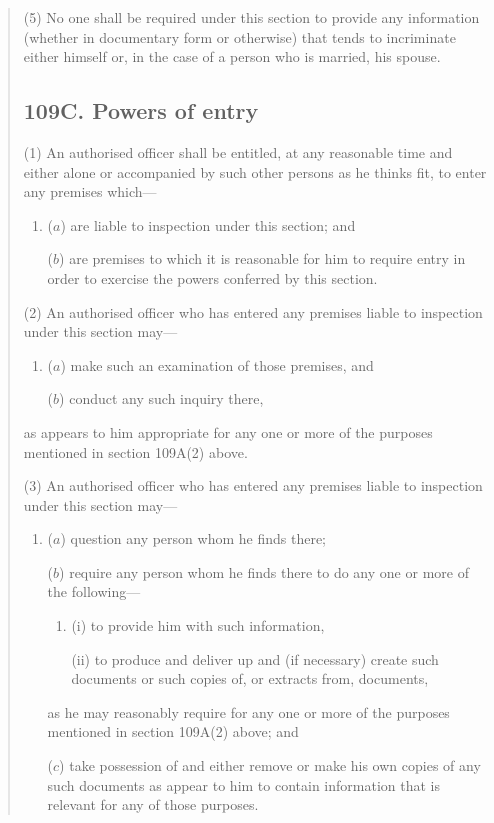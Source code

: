 \documentclass[12pt,a4paper]{article}
\begin{document}
\begin{quotation}
(5) No one shall be required under this section to provide any information (whether in documentary form or otherwise) that tends to incriminate either himself or, in the case of a person who is married, his spouse.

\subsection*{109C. Powers of entry}

(1) An authorised officer shall be entitled, at any reasonable time and either alone or accompanied by such other persons as he thinks fit, to enter any premises which—
\begin{enumerate}\item[]
($a$) are liable to inspection under this section; and

($b$) are premises to which it is reasonable for him to require entry in order to exercise the powers conferred by this section.
\end{enumerate}

(2) An authorised officer who has entered any premises liable to inspection under this section may—
\begin{enumerate}\item[]
($a$) make such an examination of those premises, and

($b$) conduct any such inquiry there,
\end{enumerate}
as appears to him appropriate for any one or more of the purposes mentioned in section 109A(2)  above.

(3) An authorised officer who has entered any premises liable to inspection under this section may—
\begin{enumerate}\item[]
($a$) question any person whom he finds there;

($b$) require any person whom he finds there to do any one or more of the following—
\begin{enumerate}\item[]
(i) to provide him with such information,

(ii) to produce and deliver up and (if necessary) create such documents or such copies of, or extracts from, documents,
\end{enumerate}
as he may reasonably require for any one or more of the purposes mentioned in section 109A(2)  above; and

($c$) take possession of and either remove or make his own copies of any such documents as appear to him to contain information that is relevant for any of those purposes.
\end{enumerate}


\end{quotation}
\end{document}

